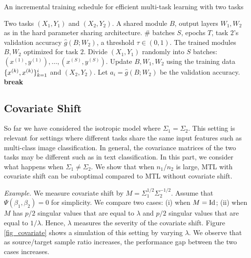 \begin{algorithm}[!t]
	\caption{An incremental training schedule for efficient multi-task learning with two tasks}
	\label{alg_inc_train}
	\begin{algorithmic}[1]
		\Input Two tasks $(X_1, Y_1)$ and $(X_2, Y_2)$.
		\Param A shared module $B$, output layers $W_1, W_2$ as in the hard parameter sharing architecture.
		\Req \# batches $S$, epochs $T$, task $2$'s validation accuracy $\hat{g}(B; W_2)$, a threshold $\tau\in(0,1)$.
		\Output The trained modules $B, W_2$ optimized for task $2$.
		\State Divide $(X_1, Y_1)$ randomly into $S$ batches: $(x^{(1)}, y^{(1)}), \dots, (x^{(S)}, y^{(S)})$.
				\State Update $B, W_1, W_2$ using the training data $\{x^{(k)}, x^{(k)}\}_{k=1}^i$ and  $(X_2, Y_2)$.
			\EndFor
			\State Let $a_i = \hat{g}(B; W_2)$ be the validation accuracy.
				\State \textbf{break}
			\EndIf
		\EndFor
	\end{algorithmic}
\end{algorithm}



\subsection{Covariate Shift}\label{sec_covshift}

So far we have considered the isotropic model where $\Sigma_1 = \Sigma_2$.
This setting is relevant for settings where different tasks share the same input features such as multi-class image classification.
In general, the covariance matrices of the two tasks may be different such as in text classification.
In this part, we consider what happens when $\Sigma_1 \neq \Sigma_2$.
We show that when $n_1 / n_2$ is large, MTL with covariate shift can be suboptimal compared to MTL without covariate shift.

\textit{Example.}
	We measure covariate shift by $M = \Sigma_1^{1/2} \Sigma_2^{-1/2}$.
	Assume that $\Psi(\beta_1, \beta_2) = 0$ for simplicity.
	We compare two cases: (i) when $M = \operatorname{Id}$; (ii) when $M$ has $p/2$ singular values that are equal to $\lambda$ and $p/2$ singular values that are equal to $1 / \lambda$.
	Hence, $\lambda$ measures the severity of the covariate shift.
	Figure \ref{fig_covariate} shows a simulation of this setting by varying $\lambda$.
	We observe that as source/target sample ratio increases, the performance gap between the two cases increases.

